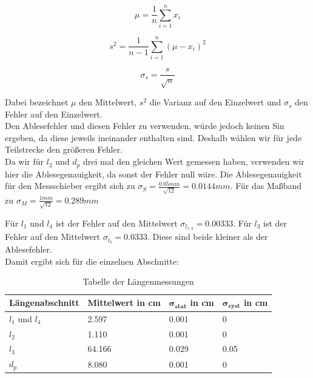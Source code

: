 \documentclass[twoside]{protokoll}
\begin{document}
\begin{equation}
	\mu = \frac{1}{n}\sum_{i=1}^nx_i
\end{equation}

\begin{equation}
	s^2 = \frac{1}{n-1}\sum_{i=1}^n(\mu-x_i)^2
\end{equation}

\begin{equation}
	\sigma_s = \frac{s}{\sqrt{n}} 
\end{equation}

Dabei bezeichnet $\mu$ den Mittelwert, $s^2$ die Varianz auf den Einzelwert und $\sigma_s$ den Fehler auf den Einzelwert.\\

Den Ablesefehler und diesen Fehler zu verwenden, würde jedoch keinen Sin ergeben, da diese jeweils ineinander enthalten sind. 
Deshalb wählen wir für jede Teilstrecke den größeren Fehler. \\

Da wir für $l_2$ und $d_p$ drei mal den gleichen Wert gemessen haben, verwenden wir hier die Ablesegenauigkeit, da sonst der Fehler null wäre.
Die Ablesegenauigkeit für den Messschieber ergibt sich zu $\sigma_S = \frac{0.05mm}{\sqrt{12}} = 0.0144mm $. Für das Maßband zu $\sigma_M = \frac{1mm}{\sqrt{12}} = 0.289mm$

Für $l_1$ und $l_4$ ist der Fehler auf den Mittelwert $\sigma_{l_{1,4}} = 0.00333$.
Für $l_3$ ist der Fehler auf den Mittelwert $ \sigma_{l_3} = 0.0333$.
Diese sind beide kleiner als der Ablesefehler.\\

Damit ergibt sich für die einzelnen Abschnitte:

\begin{table}[H]
        \centering
        \begin{tabularx}{1.0\textwidth}{X X X X} %
            \toprule
            \textbf{Längenabschnitt} & \textbf{Mittelwert in cm} & $\mathbf{\sigma_{stat}}$ in cm & $\mathbf{\sigma_{syst}}$ in cm\\
            \midrule
            $l_1$ und $l_4$ & 2.597 & 0.001 & 0 \\
            $l_2$ & 1.110 & 0.001 & 0\\
            $l_3$ & 64.166 & 0.029 & 0.05\\
            $d_p$ & 8.080 & 0.001 & 0\\
            \bottomrule
        \end{tabularx}
        \caption{Tabelle der Längenmessungen}
        \label{tab:längen un fehler}
    \end{table}
\end{document}
